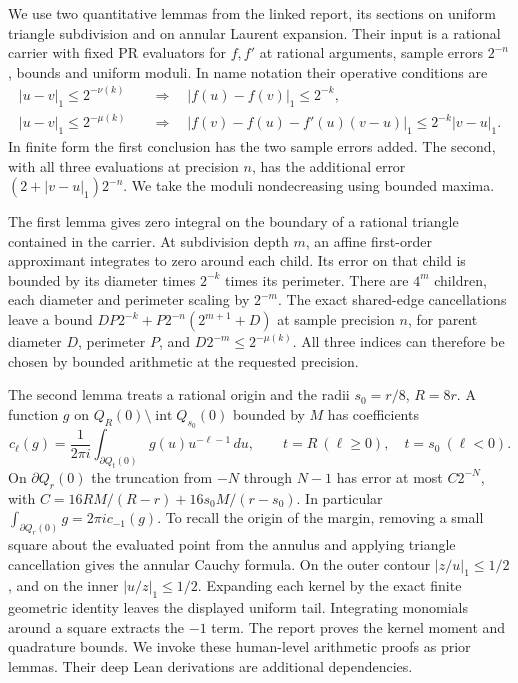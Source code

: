 We use two quantitative lemmas from the linked report, its sections on uniform triangle subdivision and on annular Laurent expansion. Their input is a rational carrier with fixed PR evaluators for $f,f'$ at rational arguments, sample errors $2^{-n}$, bounds and uniform moduli. In name notation their operative conditions are
\[
 \begin{aligned}
 |u-v|_1\le2^{-\nu(k)}&\quad\Longrightarrow\quad |f(u)-f(v)|_1\le2^{-k},\\
 |u-v|_1\le2^{-\mu(k)}&\quad\Longrightarrow\quad
 |f(v)-f(u)-f'(u)(v-u)|_1\le2^{-k}|v-u|_1.
 \end{aligned}
\]
In finite form the first conclusion has the two sample errors added. The second, with all three evaluations at precision $n$, has the additional error $(2+|v-u|_1)2^{-n}$. We take the moduli nondecreasing using bounded maxima.

The first lemma gives zero integral on the boundary of a rational triangle contained in the carrier. At subdivision depth $m$, an affine first-order approximant integrates to zero around each child. Its error on that child is bounded by its diameter times $2^{-k}$ times its perimeter. There are $4^m$ children, each diameter and perimeter scaling by $2^{-m}$. The exact shared-edge cancellations leave a bound $DP2^{-k}+P2^{-n}(2^{m+1}+D)$ at sample precision $n$, for parent diameter $D$, perimeter $P$, and $D2^{-m}\le2^{-\mu(k)}$. All three indices can therefore be chosen by bounded arithmetic at the requested precision.

The second lemma treats a rational origin and the radii $s_0=r/8$, $R=8r$. A function $g$ on $Q_R(0)\setminus\operatorname{int}Q_{s_0}(0)$ bounded by $M$ has coefficients
\[
 c_\ell(g)=\frac{1}{2\pi i}\int_{\partial Q_t(0)}g(u)u^{-\ell-1}\,du,
 \qquad t=R\ (\ell\ge0),\quad t=s_0\ (\ell<0).
\]
On $\partial Q_r(0)$ the truncation from $-N$ through $N-1$ has error at most
$C2^{-N}$, with $C=16RM/(R-r)+16s_0M/(r-s_0)$. In particular $\int_{\partial Q_r(0)} g=2\pi i c_{-1}(g)$. To recall the origin of the margin, removing a small square about the evaluated point from the annulus and applying triangle cancellation gives the annular Cauchy formula. On the outer contour $|z/u|_1\le1/2$, and on the inner $|u/z|_1\le1/2$. Expanding each kernel by the exact finite geometric identity leaves the displayed uniform tail. Integrating monomials around a square extracts the $-1$ term. The report proves the kernel moment and quadrature bounds. We invoke these human-level arithmetic proofs as prior lemmas. Their deep Lean derivations are additional dependencies.

